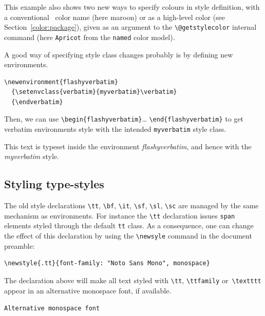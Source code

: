 This example also shows two new ways to specify colours in style
definition, with a
conventional \html~color name (here {\ifhevea\maroon\fi maroon}) or as
a high-level color (see Section~\ref{color:package}), given as an argument to
the \verb+\@getstylecolor+ internal command
(here \colorbox{abricot}{\texttt{Apricot}} from the \texttt{named} color model).

A good way of specifying style class changes probably is by defining
new environments.
\begin{verbatim}
\newenvironment{flashyverbatim}
  {\setenvclass{verbatim}{myverbatim}\verbatim}
  {\endverbatim}
\end{verbatim}
\newenvironment{flashyverbatim}
  {\setenvclass{verbatim}{myverbatim}\verbatim}
  {\endverbatim}%
Then, we can use \verb+\begin{flashyverbatim}+\ldots{}
\verb+\end{flashyverbatim}+ to get verbatim environments style with
the intended \texttt{myverbatim} style class.
\begin{htmlonly}\begin{flashyverbatim}
This text is typeset inside the environment
\emph{flashyverbatim}, and hence with the \emph{myverbatim}
style.
\end{flashyverbatim}
\end{htmlonly}

\subsection{Styling \label{typestyle:css}type-styles}
The old style declarations \verb+\tt+, \verb+\bf+, \verb+\it+, \verb+\sf+,
\verb+\sl+, \verb+\sc+ are managed by the same mechanism as environments.
For instance the \verb+\tt+ declaration issues \verb+span+ elements styled through the default \verb+tt+ class. As a consequence, one can change the effect of this declaration by using the \verb+\newsyle+ command in the document preamble:
\begin{verbatim}
\newstyle{.tt}{font-family: "Noto Sans Mono", monospace}
\end{verbatim}
The declaration above will make all text styled
with \verb+\tt+, \verb+\ttfamily+ or~\verb+\textttt+ appear in
an alternative monospace font, if available.
\begin{htmlonly}
\begin{flushleft}
\texttt{Alternative monospace font}
\end{flushleft}
\end{htmlonly}

